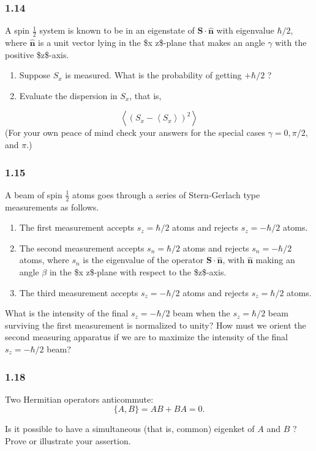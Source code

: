 \documentclass[11pt]{article}
\begin{document}
\subsubsection{1.14}
\label{sec:org29509ff}
A spin \(\frac{1}{2}\) system is known to be in an eigenstate of \(\mathbf{S} \cdot \hat{\mathbf{n}}\) with eigenvalue \(\hbar / 2\), where \(\hat{\mathbf{n}}\) is a unit vector lying in the \$x z\$-plane that makes an angle \(\gamma\) with the positive \$z\$-axis.
\begin{enumerate}
\item Suppose \(S_x\) is measured. What is the probability of getting \(+\hbar / 2\) ?
\item Evaluate the dispersion in \(S_x\), that is,
\end{enumerate}
$$
\left\langle\left(S_x-\left\langle S_x\right\rangle\right)^2\right\rangle
$$
(For your own peace of mind check your answers for the special cases \(\gamma=0, \pi / 2\), and \(\pi\).)
\subsubsection{1.15}
\label{sec:orgea5c64e}
A beam of spin \(\frac{1}{2}\) atoms goes through a series of Stern-Gerlach type measurements as follows.
\begin{enumerate}
\item The first measurement accepts \(s_z=\hbar / 2\) atoms and rejects \(s_z=-\hbar / 2\) atoms.
\item The second measurement accepts \(s_n=\hbar / 2\) atoms and rejects \(s_n=-\hbar / 2\) atoms, where \(s_n\) is the eigenvalue of the operator \(\mathbf{S} \cdot \hat{\mathbf{n}}\), with \(\hat{\mathbf{n}}\) making an angle \(\beta\) in the \$x z\$-plane with respect to the \$z\$-axis.
\item The third measurement accepts \(s_z=-\hbar / 2\) atoms and rejects \(s_z=\hbar / 2\) atoms.
\end{enumerate}
What is the intensity of the final \(s_z=-\hbar / 2\) beam when the \(s_z=\hbar / 2\) beam surviving the first measurement is normalized to unity? How must we orient the second measuring apparatus if we are to maximize the intensity of the final \(s_z=-\hbar / 2\) beam?
\subsubsection{1.18}
\label{sec:org6689bea}
Two Hermitian operators anticommute:
$$
\{A, B\}=A B+B A=0 .
$$

Is it possible to have a simultaneous (that is, common) eigenket of \(A\) and \(B\) ? Prove or illustrate your assertion.
\end{document}
